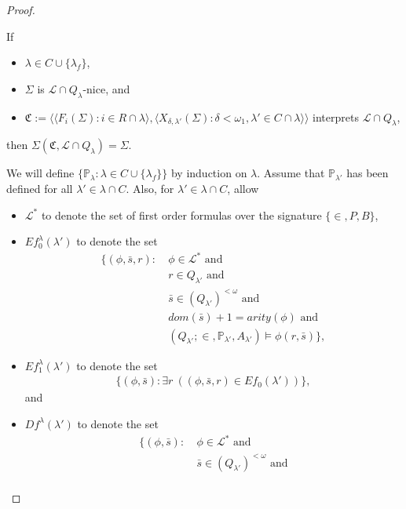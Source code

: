 \documentclass[12pt]{article}
\numberwithin{equation}{section}
\begin{document}
\begin{proof}
\begin{rem}\label{rem416}
If 
\begin{itemize}
    \item $\lambda \in C \cup \{\lambda_f\}$, 
    \item $\Sigma$ is $\mathcal{L} \cap Q_{\lambda}$-nice, and
    \item $\mathfrak{C} := \langle \langle F_i(\Sigma) : i \in R \cap \lambda \rangle, \langle X_{\delta, \lambda'}(\Sigma) : \delta < \omega_1, \lambda' \in C \cap \lambda \rangle \rangle$ interprets $\mathcal{L} \cap Q_{\lambda}$,
\end{itemize}
then $\Sigma(\mathfrak{C}, \mathcal{L} \cap Q_{\lambda}) = \Sigma$.
\end{rem}

We will define $\{\mathbb{P}_{\lambda} : \lambda \in C \cup \{\lambda_f\}\}$ by induction on $\lambda$. Assume that $\mathbb{P}_{\lambda'}$ has been defined for all $\lambda' \in \lambda \cap C$. Also, for $\lambda' \in \lambda \cap C$, allow 
\begin{itemize}
    \item $\mathcal{L^*}$ to denote the set of first order formulas over the signature $\{\in, P, B\}$,
    \item $Ef_0^{\lambda}(\lambda')$ to denote the set 
    \begin{align*}
        \{(\phi, \bar{s}, r) : \ & \phi \in \mathcal{L}^* \text{ and} \\
        & r \in Q_{\lambda'} \text{ and} \\
        & \bar{s} \in (Q_{\lambda'})^{< \omega} \text{ and} \\
        & dom(\bar{s}) + 1 = arity(\phi) \text{ and} \\
        & (Q_{\lambda'}; \in, \mathbb{P}_{\lambda'}, A_{\lambda'}) \models \phi(r, \bar{s})\},
    \end{align*}
    \item $Ef_1^{\lambda}(\lambda')$ to denote the set
    \begin{align*}
        \{(\phi, \bar{s}) : \exists r \ ((\phi, \bar{s}, r) \in Ef_0(\lambda'))\},
    \end{align*}
    and
    \item $Df^{\lambda}(\lambda')$ to denote the set 
    \begin{align*}
        \{(\phi, \bar{s}) : \ & \phi \in \mathcal{L}^* \text{ and} \\
        & \bar{s} \in (Q_{\lambda'})^{< \omega} \text{ and} \\

\end{align*}
\end{itemize}
\end{proof}
\end{document}
